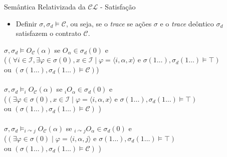     \begin{frame}{Semântica Relativizada da $\mathcal{CL}$ - Satisfação}
        \begin{itemize}
            \item Definir  $\sigma, \sigma_d \models \mathcal{C}$, ou seja, se o \textit{trace} se ações $\sigma$ e o \textit{trace} deôntico $\sigma_d$ satisfazem o contrato $\mathcal{C}$.
        \end{itemize}
        
        {\small 
            $\sigma,\sigma_d \models O_\mathcal{C}(\alpha)$ se {\color{purple}$O_{\alpha} \in \sigma_d(0) $} e \\
            ({\color{blue}$(\forall i \in \mathcal{I}, \exists \varphi \in \sigma(0), x \in \mathcal{I} \mid \varphi = \langle i, \alpha, x\rangle \mbox{ e } \sigma(1\dots),\sigma_d(1\dots) \models \top)$} \\
            ou  {\color{red} $(\sigma(1\dots),\sigma_d(1\dots) \models \mathcal{C})$})
            \\\quad\\
            $\sigma,\sigma_d \models _iO_\mathcal{C}(\alpha)$ se {\color{purple}$_iO_{\alpha}\in\sigma_d(0) $} e \\
            ({\color{blue}$(\exists \varphi \in \sigma(0), x\in \mathcal{I} \mid \varphi = \langle i,\alpha,x\rangle  \mbox{ e } \sigma(1\dots),\sigma_d(1\dots) \models \top)$} \\
            ou  {\color{red} $(\sigma(1\dots),\sigma_d(1\dots) \models \mathcal{C})$ })
            \\\quad\\
            $\sigma,\sigma_d \models _{i\curvearrowright j}O_\mathcal{C}(\alpha)$ se {\color{purple}$_{i\curvearrowright j}O_{\alpha}\in\sigma_d(0)$} e \\
            ({\color{blue}$(\exists \varphi \in \sigma(0) \mid \varphi = \langle i, \alpha, j \rangle \mbox{ e } \sigma(1\dots),\sigma_d(1\dots) \models \top)$} \\
            ou  {\color{red} $(\sigma(1\dots),\sigma_d(1\dots) \models \mathcal{C})$ })
        }
    \end{frame}
    
